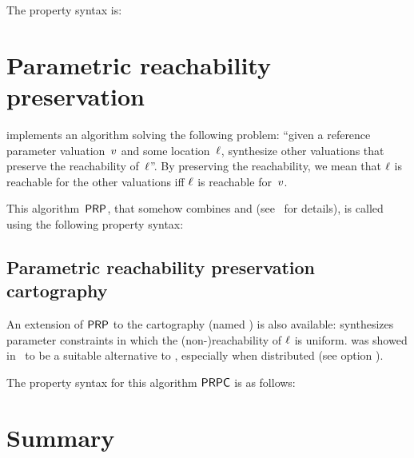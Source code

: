 The property syntax is:




\section{Parametric reachability preservation}\label{ss:mode:PRP}

\imitator{} implements an algorithm solving the following problem:
``given a reference parameter valuation~$v$ and some location~$\ell$, synthesize other valuations that preserve the reachability of~$\ell$''.
By preserving the reachability, we mean that $\ell$ is reachable for the other valuations iff $\ell$ is reachable for~$v$.

This algorithm~$\mathsf{PRP}$, that somehow combines \EFsynth{} and \IM{} (see~\cite{ALNS15} for details), is called using the following property syntax:




\subsection*{Parametric reachability preservation cartography}\label{sss:mode:PRPC}

An extension of $\mathsf{PRP}$ to the cartography (named \PRPC{}) is also available: \PRPC{} synthesizes parameter constraints in which the (non-)reachability of $\ell$ is uniform.
\PRPC{} was showed in~\cite{ALNS15} to be a suitable alternative to \EFsynth{}, especially when distributed (see option ).

The property syntax for this algorithm $\mathsf{PRPC}$ is as follows:




\section{Summary}\label{ss:mode:summary}

